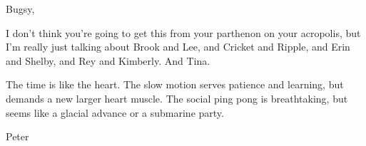 

Bugsy,

I don't think you're going to get this from your parthenon on your
acropolis, but I'm really just talking about Brook and Lee, and
Cricket and Ripple, and Erin and Shelby, and Rey and Kimberly.  And
Tina.

The time is like the heart.  The slow motion serves patience and
learning, but demands a new larger heart muscle.  The social ping pong
is breathtaking, but seems like a glacial advance or a submarine
party.

Peter


\bye
